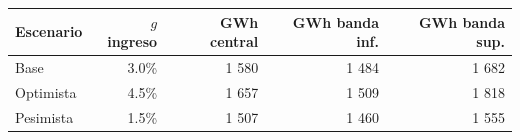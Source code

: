 
\begin{tabular}{lrrrr}
\toprule
Escenario & $g$ ingreso & GWh central & GWh banda inf. & GWh banda sup.\\
\midrule
Base & 3.0\% & 1 580 & 1 484 & 1 682\\
Optimista & 4.5\% & 1 657 & 1 509 & 1 818\\
Pesimista & 1.5\% & 1 507 & 1 460 & 1 555\\
\bottomrule
\end{tabular}
